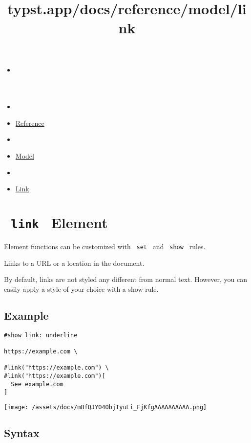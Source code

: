 \title{typst.app/docs/reference/model/link}

\begin{itemize}
\tightlist
\item
  \href{/docs}{}
\item
  
\item
  \href{/docs/reference/}{Reference}
\item
  
\item
  \href{/docs/reference/model/}{Model}
\item
  
\item
  \href{/docs/reference/model/link/}{Link}
\end{itemize}

\section{\texorpdfstring{\texttt{\ link\ } {{ Element
}}}{ link   Element }}\label{summary}

\label{element-tooltip}
Element functions can be customized with \texttt{\ set\ } and
\texttt{\ show\ } rules.

Links to a URL or a location in the document.

By default, links are not styled any different from normal text.
However, you can easily apply a style of your choice with a show rule.

\subsection{Example}\label{example}

\begin{verbatim}
#show link: underline

https://example.com \

#link("https://example.com") \
#link("https://example.com")[
  See example.com
]
\end{verbatim}

\texttt{[image: /assets/docs/mBfQJYO4ObjIyuLi\_FjKfgAAAAAAAAAA.png]}

\subsection{Syntax}\label{syntax}

